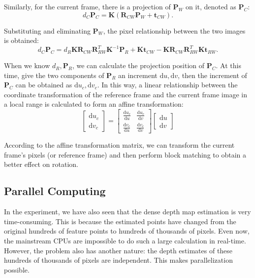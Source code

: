Similarly, for the current frame, there is a projection of $\mathbf{P}_W$ on it, denoted as $\mathbf{P}_C$:
\begin{equation}
	d_C {\mathbf{P}_C} = \mathbf{K} \left( {{\mathbf{R}_{{CW}}}{\mathbf{P}_W} + {\mathbf{t}_{{CW}}}} \right).
\end{equation}

Substituting and eliminating $\mathbf{P}_W$, the pixel relationship between the two images is obtained:
\begin{equation}
	d_C {\mathbf{P}_C} = d_R \mathbf{K} \mathbf{R}_{{CW}} \mathbf{R}_{{RW}}^T \mathbf{K}^{-1} \mathbf{P}_R + \mathbf{K} \mathbf{t}_{{CW}} - \mathbf{K} \mathbf{R}_{{CW}} \mathbf{R}_{{RW}}^T \mathbf{K} \mathbf{t}_{{RW}}.
\end{equation}

When we know $d_R, \mathbf{P}_R$, we can calculate the projection position of $\mathbf{P}_C$. At this time, give the two components of $\mathbf{P}_R$ an increment $\mathrm{d}u, \mathrm{d}v$, then the increment of $\mathbf{P}_C$ can be obtained as $\mathrm{d}u_c, \mathrm{d}v_c$. In this way, a linear relationship between the coordinate transformation of the reference frame and the current frame image in a local range is calculated to form an affine transformation:
\begin{equation}
	\left[ \begin{array}{l}
		\mathrm{d}u_c\\
		\mathrm{d}v_c
	\end{array} \right] = \left[ {\begin{array}{*{20}{c}}
			{\frac{{\mathrm{d}u_c}}{{\mathrm{d}u}}}&{\frac{{\mathrm{d}u_c}}{{\mathrm{d}v}}}\\
			{\frac{{\mathrm{d}v_c}}{{\mathrm{d}u}}}&{\frac{{\mathrm{d}v_c}}{{\mathrm{d}v}}}
	\end{array}} \right]\left[ \begin{array}{l}
		\mathrm{d}u\\
		\mathrm{d}v
	\end{array} \right]
\end{equation}

According to the affine transformation matrix, we can transform the current frame's pixels (or reference frame) and then perform block matching to obtain a better effect on rotation.

\subsection{Parallel Computing}
In the experiment, we have also seen that the dense depth map estimation is very time-consuming. This is because the estimated points have changed from the original hundreds of feature points to hundreds of thousands of pixels. Even now, the mainstream CPUs are impossible to do such a large calculation in real-time. However, the problem also has another nature: the depth estimates of these hundreds of thousands of pixels are independent. This makes parallelization possible.

